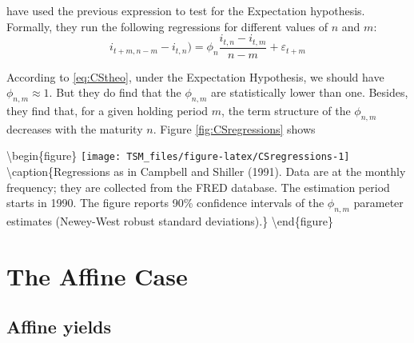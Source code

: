 \documentclass[
  12pt,
]{book}
\theoremstyle{definition}
\theoremstyle{definition}
\theoremstyle{definition}
\theoremstyle{definition}
\theoremstyle{remark}
\begin{document}
\citet{Campbell_Shiller_1991} have used the previous expression to test for the Expectation hypothesis. Formally, they run the following regressions for different values of \(n\) and \(m\):
\[
i_{t+m,n-m}-i_{t,n}) = \phi_n\frac{i_{t,n}-i_{t,m}}{n-m} + \varepsilon_{t+m}
\]

According to \eqref{eq:CStheo}, under the Expectation Hypothesis, we should have \(\phi_{n,m} \approx 1\). But they do find that the \(\phi_{n,m}\) are statistically lower than one. Besides, they find that, for a given holding period \(m\), the term structure of the \(\phi_{n,m}\) decreases with the maturity \(n\). Figure \ref{fig:CSregressions} shows

\textbackslash begin\{figure\}
\texttt{[image: TSM\_files/figure-latex/CSregressions-1]} \textbackslash caption\{Regressions as in Campbell and Shiller (1991). Data are at the monthly frequency; they are collected from the FRED database. The estimation period starts in 1990. The figure reports 90\% confidence intervals of the \(\phi_{n,m}\) parameter estimates (Newey-West robust standard deviations).\}\label{fig:CSregressions}
\textbackslash end\{figure\}

\hypertarget{RiskFreeAffine}{%
\section{The Affine Case}\label{RiskFreeAffine}}

\hypertarget{AffineYields}{%
\subsection{Affine yields}\label{AffineYields}}
\end{document}
